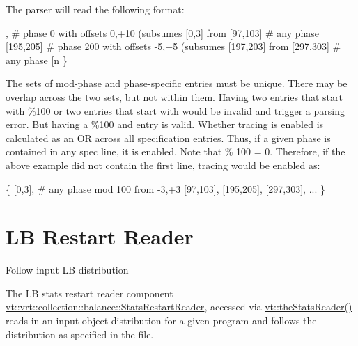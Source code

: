 The parser will read the following format\+:


, # phase 0 with offsets 0,+10 (subsumes [0,3] from %
  [97,103] # any phase %
  [195,205] # phase 200 with offsets -5,+5 (subsumes [197,203] from %
  [297,303] # any phase %
  [n%
\}
\end{DoxyCode}


The sets of mod-\/phase and phase-\/specific entries must be unique. There may be overlap across the two sets, but not within them. Having two entries that start with {\ttfamily \%100} or two entries that start with {} would be invalid and trigger a parsing error. But having a {\ttfamily \%100} and {} entry is valid. Whether tracing is enabled is calculated as an OR across all specification entries. Thus, if a given phase is contained in any spec line, it is enabled. Note that { \% 100 = 0}. Therefore, if the above example did not contain the first line, tracing would be enabled as\+:


\begin{DoxyCode}
\{
  [0,3], # any phase mod 100 from -3,+3
  [97,103],
  [195,205],
  [297,303], ...
\}
\end{DoxyCode}
 \hypertarget{stats-reader}{}\section{LB Restart Reader}\label{stats-reader}
Follow input LB distribution

The LB stats restart reader component {\ttfamily \hyperlink{structvt_1_1vrt_1_1collection_1_1balance_1_1_stats_restart_reader}{vt\+::vrt\+::collection\+::balance\+::\+Stats\+Restart\+Reader}}, accessed via {\ttfamily \hyperlink{namespacevt_ad73860100c7d2ca1d833eab74942ee73}{vt\+::the\+Stats\+Reader()}} reads in an input object distribution for a given program and follows the distribution as specified in the file.

